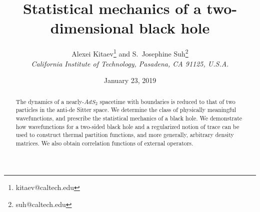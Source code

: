 \documentclass[11pt]{article}
\title {Statistical mechanics of a two-dimensional black hole}
\author{Alexei Kitaev\footnote{kitaev@caltech.edu}\; and
S.\ Josephine Suh\footnote{suh@caltech.edu}\\
\normalsize\it California Institute of Technology, Pasadena, CA 91125, U.S.A.\vspace{0.5cm}}
\date{January 23, 2019}
\DeclareMathOperator{\AdS}{AdS}
\def\AdS{AdS}
\begin{document}
\setcounter{tocdepth}{2}

\maketitle
\begin{abstract}
The dynamics of a nearly-$\AdS_2$ spacetime with boundaries is reduced to that of two particles in the anti-de Sitter space. We determine the class of physically meaningful wavefunctions, and prescribe the statistical mechanics of a black hole. We demonstrate how wavefunctions for a two-sided black hole and a regularized notion of trace can be used to construct thermal partition functions, and more generally, arbitrary density matrices. We also obtain correlation functions of external operators.
\end{abstract}

\tableofcontents
\newpage
\end{document}
